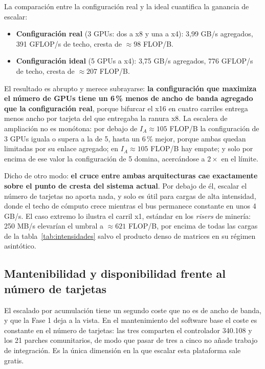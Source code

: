 \documentclass[a4paper,11pt]{article}
\begin{document}
La comparación entre la configuración real y la ideal cuantifica la ganancia de escalar:
\begin{itemize}[leftmargin=*,itemsep=2pt]
    \item \textbf{Configuración real} (3 GPUs: dos a x8 y una a x4): 3,99 GB/s agregados, 391 GFLOP/s de techo, cresta de
    $\approx 98$ FLOP/B.
    \item \textbf{Configuración ideal} (5 GPUs a x4): 3,75 GB/s agregados, 776 GFLOP/s de techo, cresta de $\approx 207$ FLOP/B.
\end{itemize}
El resultado es abrupto y merece subrayarse: \textbf{la configuración que maximiza el número de GPUs tiene un 6\,\% menos de ancho
de banda agregado que la configuración real}, porque bifurcar el x16 en cuatro carriles entrega menos ancho por tarjeta del que
entregaba la ranura x8. La escalera de ampliación no es monótona: por debajo de $I_A \approx 105$ FLOP/B la configuración de 3
GPUs iguala o supera a la de 5, hasta un 6\,\% mejor, porque ambas quedan limitadas por su enlace agregado; en $I_A \approx 105$
FLOP/B hay empate; y solo por encima de ese valor la configuración de 5 domina, acercándose a $2\times$ en el límite.

Dicho de otro modo: \textbf{el cruce entre ambas arquitecturas cae exactamente sobre el punto de cresta del sistema actual}. Por
debajo de él, escalar el número de tarjetas no aporta nada, y solo es útil para cargas de alta intensidad, donde el techo de
cómputo crece mientras el bus permanece constante en unos 4 GB/s. El caso extremo lo ilustra el carril x1, estándar en los
\textit{risers} de minería: 250 MB/s elevarían el umbral a $\approx 621$ FLOP/B, por encima de todas las cargas de la
tabla~\ref{tab:intensidades} salvo el producto denso de matrices en su régimen asintótico.

\subsection*{Mantenibilidad y disponibilidad frente al número de tarjetas}

El escalado por acumulación tiene un segundo coste que no es de ancho de banda, y que la Fase 1 deja a la vista. En el
mantenimiento del software base el coste es constante en el número de tarjetas: las tres comparten el controlador 340.108 y los
21 parches comunitarios, de modo que pasar de tres a cinco no añade trabajo de integración. Es la única dimensión en la que
escalar esta plataforma sale gratis.
\end{document}
